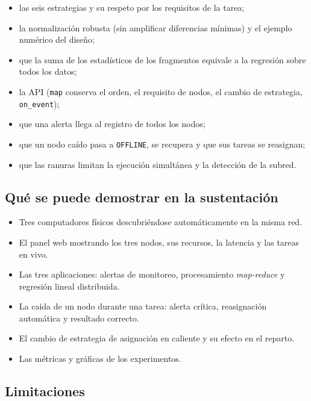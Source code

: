 \begin{itemize}
\item las seis estrategias y su respeto por los requisitos de la tarea;
\item la normalización robusta (sin amplificar diferencias mínimas) y el ejemplo numérico del diseño;
\item que la suma de los estadísticos de los fragmentos equivale a la regresión sobre todos los datos;
\item la API (\texttt{map} conserva el orden, el requisito de nodos, el cambio de estrategia, \texttt{on\_event});
\item que una alerta llega al registro de todos los nodos;
\item que un nodo caído pasa a \texttt{OFFLINE}, se recupera y que sus tareas se reasignan;
\item que las ranuras limitan la ejecución simultánea y la detección de la subred.
\end{itemize}

\subsection{Qué se puede demostrar en la sustentación}

\begin{itemize}
\item Tres computadores físicos descubriéndose automáticamente en la misma red.
\item El panel web mostrando los tres nodos, sus recursos, la latencia y las tareas en vivo.
\item Las tres aplicaciones: alertas de monitoreo, procesamiento \emph{map-reduce} y regresión
lineal distribuida.
\item La caída de un nodo durante una tarea: alerta crítica, reasignación automática y resultado
correcto.
\item El cambio de estrategia de asignación en caliente y su efecto en el reparto.
\item Las métricas y gráficas de los experimentos.
\end{itemize}

\subsection{Limitaciones}

